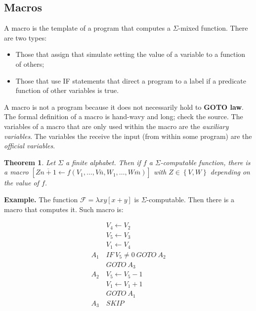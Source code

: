 \documentclass[a4paper, 12pt]{article}
\newtheorem{theorem}{Theorem}
\newtheorem{theorem}{Theorem}
\begin{document}
\subsection{Macros}

A macro is the template of a program that computes a $\Sigma$-mixed function.
There are two types: 

\begin{itemize}
    \item Those that assign that simulate setting the value of a variable to a
        function of others; 
    \item Those that use IF statements that direct a program to a label if a
        predicate function of other variables is true.
\end{itemize}

A macro is not a program because it does not necessarily hold to \textbf{GOTO
law}. The formal definition of a macro is hand-wavy and long; check the source.
The variables of a macro that are only used within the macro are the
\textit{auxiliary variables}. The variables the receive the input (from within
some program) are the \textit{official variables}. 

\begin{theorem}
    Let $\Sigma$ a finite alphabet. Then if $f$ a $\Sigma$-computable function,
    there is a macro $\left[ Z \overline{n+1} \leftarrow f \left( V_1, \ldots, V
    \overline{n}, W_1, \ldots, W \overline{m}\right)  \right] $ with $Z \in
    \left\{ V, W \right\} $ depending on the value of $f$.
\end{theorem}

\textbf{Example.} The function $\mathcal{F} = \lambda xy[x + y]$ is
$\Sigma$-computable. Then there is a macro that computes it. Such macro is: 

\begin{align*}
    &V_4 \leftarrow V_2 \\ 
    &V_5 \leftarrow  V_3 \\ 
    &V_1 \leftarrow V_4 \\ 
    A_1 ~ & IF ~ V_5 \neq 0 ~ GOTO ~ A_2 \\ 
    & GOTO~ A_3 \\ 
    A_2 ~ & V_5 \leftarrow V_5 - 1 \\ 
          &V_1 \leftarrow V_1 + 1 \\ 
          &GOTO ~ A_1 \\ 
    A_3 ~ & SKIP
\end{align*}
\end{document}
